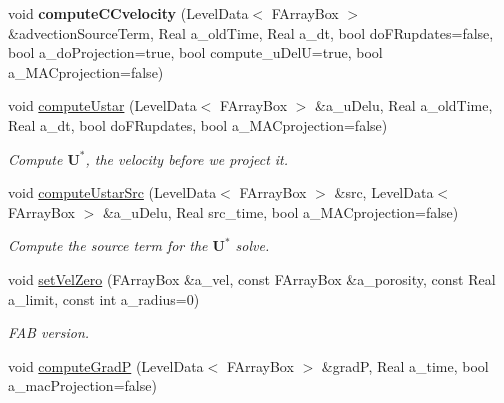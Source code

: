 \begin{DoxyCompactItemize}
\item 
\hypertarget{class_a_m_r_level_mushy_layer_add5a2303e20f8efa62a09005dc48bc6d}{void {\bfseries compute\-C\-Cvelocity} (Level\-Data$<$ F\-Array\-Box $>$ \&advection\-Source\-Term, Real a\-\_\-old\-Time, Real a\-\_\-dt, bool do\-F\-Rupdates=false, bool a\-\_\-do\-Projection=true, bool compute\-\_\-u\-Del\-U=true, bool a\-\_\-\-M\-A\-Cprojection=false)}\label{class_a_m_r_level_mushy_layer_add5a2303e20f8efa62a09005dc48bc6d}

\item 
\hypertarget{class_a_m_r_level_mushy_layer_a059eedd6197f85a0d1638ca6183295d4}{void \hyperlink{class_a_m_r_level_mushy_layer_a059eedd6197f85a0d1638ca6183295d4}{compute\-Ustar} (Level\-Data$<$ F\-Array\-Box $>$ \&a\-\_\-u\-Delu, Real a\-\_\-old\-Time, Real a\-\_\-dt, bool do\-F\-Rupdates, bool a\-\_\-\-M\-A\-Cprojection=false)}\label{class_a_m_r_level_mushy_layer_a059eedd6197f85a0d1638ca6183295d4}

\begin{DoxyCompactList}\small\item\em Compute $ \mathbf{U}^* $, the velocity before we project it. \end{DoxyCompactList}\item 
\hypertarget{class_a_m_r_level_mushy_layer_aeaec7664c5366f241354c00436e4a87f}{void \hyperlink{class_a_m_r_level_mushy_layer_aeaec7664c5366f241354c00436e4a87f}{compute\-Ustar\-Src} (Level\-Data$<$ F\-Array\-Box $>$ \&src, Level\-Data$<$ F\-Array\-Box $>$ \&a\-\_\-u\-Delu, Real src\-\_\-time, bool a\-\_\-\-M\-A\-Cprojection=false)}\label{class_a_m_r_level_mushy_layer_aeaec7664c5366f241354c00436e4a87f}

\begin{DoxyCompactList}\small\item\em Compute the source term for the $\mathbf{U}^* $ solve. \end{DoxyCompactList}\item 
\hypertarget{class_a_m_r_level_mushy_layer_a1699a841bc8d8371f55c6ac45152d4ea}{void \hyperlink{class_a_m_r_level_mushy_layer_a1699a841bc8d8371f55c6ac45152d4ea}{set\-Vel\-Zero} (F\-Array\-Box \&a\-\_\-vel, const F\-Array\-Box \&a\-\_\-porosity, const Real a\-\_\-limit, const int a\-\_\-radius=0)}\label{class_a_m_r_level_mushy_layer_a1699a841bc8d8371f55c6ac45152d4ea}

\begin{DoxyCompactList}\small\item\em F\-A\-B version. \end{DoxyCompactList}\item 
\hypertarget{class_a_m_r_level_mushy_layer_ad1e22532941e086464363b556c60b82c}{void \hyperlink{class_a_m_r_level_mushy_layer_ad1e22532941e086464363b556c60b82c}{compute\-Grad\-P} (Level\-Data$<$ F\-Array\-Box $>$ \&grad\-P, Real a\-\_\-time, bool a\-\_\-mac\-Projection=false)}\label{class_a_m_r_level_mushy_layer_ad1e22532941e086464363b556c60b82c}


\end{DoxyCompactItemize}
